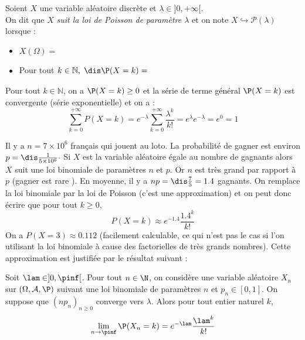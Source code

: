 \documentclass[a4paper,10pt]{report}
\begin{document}
\begin{defin}
Soient $X$ une variable aléatoire discrète et $\lambda \in ]0,+\infty[$.\\
On dit que $X$ \textit{suit la loi de Poisson de paramètre $\lambda$} et on note $X \hookrightarrow \mathcal{P}(\lambda)$ lorsque :
\begin{itemize}
 \item $X(\Omega)=\phantom{\mathbb{N}}$
 \item Pour tout $ k \in \mathbb{N},\; \dis \P(X=k)=\phantom{e^{-\lambda}\frac{\lambda^k}{k!} \cdot}$
\end{itemize}
\end{defin}

\medskip

\noindent Pour tout $k \in \mathbb{N}$, on a $\P(X=k) \geq 0$ et la série de terme général $\P(X=k)$ est convergente (série exponentielle) et on a :
$$ \sum_{k=0}^{+ \infty} P(X=k) = e^{-\lambda} \sum_{k=0}^{+ \infty} \dfrac{\lambda^k}{k!} = e^{\lambda} e^{- \lambda} = e^0=1$$


\begin{ex} Il y a $n=7 \times 10^{6}$ français qui jouent au loto. La probabilité de gagner est environ $p= \dis \frac{1}{5\times 10^6}\cdot$ Si $X$ est la variable aléatoire égale au nombre de gagnants alors $X$ suit une loi binomiale de paramètres $n$ et $p$. Or $n$ est très grand par rapport à $p$ (gagner est \og rare \fg). En moyenne, il y a $np = \dis \frac{7}{5}=1.4$ gagnants. On remplace la loi binomiale par la loi de Poisson (c'est une approximation) et on peut donc écrire que pour tout $k \geq 0$,
\[ P(X=k) \approx e^{-1.4} \frac{1.4^k}{k!}\]
On a $P(X=3) \approx 0.112$ (facilement calculable, ce qui n'est pas le cas si l'on utilisant la loi binomiale à cause des factorielles de très grands nombres). Cette approximation est justifiée par le résultat suivant :
\end{ex}

\begin{prop}
Soit $\lam \in ]0,\pinf[$. Pour tout $n \in \N$, on considère une variable aléatoire $X_n$ sur $(\Omega, \mathcal{A}, \P)$ suivant une loi binomiale de paramètres $n$ et $p_n \in [0,1]$. On suppose que $(np_n)_{n \geq 0}$ converge vers $\lambda$. Alors pour tout entier naturel $k$, 
 $$ \lim_{n\to \pinf} \P(X_n = k) = e^{-\lam} \frac{\lam^k}{k!}$$
\end{prop}

\medskip
\end{document}
